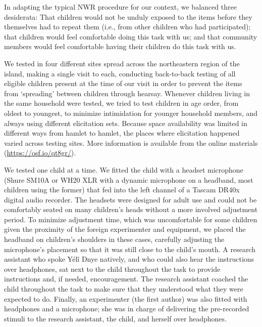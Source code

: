 \documentclass[
  american,
  ,man,floatsintext]{apa6}
\begin{document}
In adapting the typical NWR procedure for our context, we balanced three desiderata: That children would not be unduly exposed to the items before they themselves had to repeat them (i.e., from other children who had participated); that children would feel comfortable doing this task with us; and that community members would feel comfortable having their children do this task with us.

We tested in four different sites spread across the northeastern region of the island, making a single visit to each, conducting back-to-back testing of all eligible children present at the time of our visit in order to prevent the items from `spreading' between children through hearsay. Whenever children living in the same household were tested, we tried to test children in age order, from oldest to youngest, to minimize intimidation for younger household members, and always using different elicitation sets. Because space availability was limited in different ways from hamlet to hamlet, the places where elicitation happened varied across testing sites. More information is available from the online materials (\url{https://osf.io/qt8gr/}).

We tested one child at a time. We fitted the child with a headset microphone (Shure SM10A or WH20 XLR with a dynamic microphone on a headband, most children using the former) that fed into the left channel of a Tascam DR40x digital audio recorder. The headsets were designed for adult use and could not be comfortably seated on many children's heads without a more involved adjustment period. To minimize adjustment time, which was uncomfortable for some children given the proximity of the foreign experimenter and equipment, we placed the headband on children's shoulders in these cases, carefully adjusting the microphone's placement so that it was still close to the child's mouth. A research assistant who spoke Yélî Dnye natively, and who could also hear the instructions over headphones, sat next to the child throughout the task to provide instructions and, if needed, encouragement. The research assistant coached the child throughout the task to make sure that they understood what they were expected to do. Finally, an experimenter (the first author) was also fitted with headphones and a microphone; she was in charge of delivering the pre-recorded stimuli to the research assistant, the child, and herself over headphones.
\end{document}
